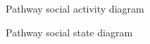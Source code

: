 ﻿\documentclass{article}
\begin{document}
\begin{figure}[H]
    \centering
    \begin{center}
    \end{center}
    \caption{Pathway social activity diagram}
    \label{fig:my_label}
\end{figure}

\begin{figure}[H]
    \centering
    \begin{center}
    \end{center}
    \caption{Pathway social state diagram}
    \label{fig:my_label}
\end{figure}
\end{document}
